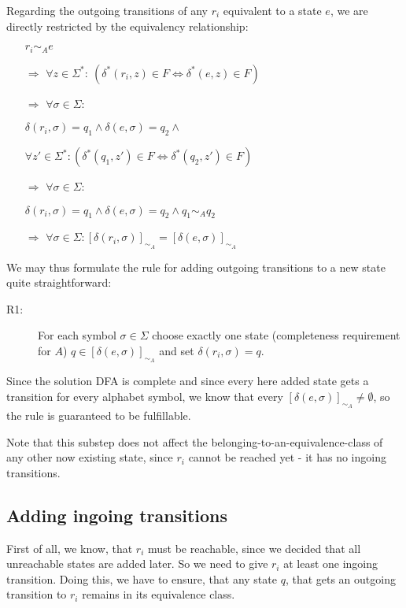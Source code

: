 Regarding the outgoing transitions of any $r_i$ equivalent to a state $e$, we are directly restricted by the equivalency relationship:
\begin{itemize}
	\item[] $r_i \sim_A e$
	\item[$\Rightarrow$] $\forall z \in \Sigma^* \colon\ (\delta^*(r_i, z) \in F \Leftrightarrow \delta^*(e, z) \in F)$
	
	\item[$\Rightarrow$] $\forall \sigma \in \Sigma \colon$
	
	\qquad $\delta(r_i, \sigma) = q_1 \land \delta(e, \sigma) = q_2 \land$
	
	\qquad $\forall z' \in \Sigma^*\colon (\delta^*(q_1, z') \in F \Leftrightarrow \delta^*(q_2, z') \in F)$
	
	\item[$\Rightarrow$] $\forall \sigma \in \Sigma \colon$
	
	\qquad $\delta(r_i, \sigma) = q_1 \land \delta(e, \sigma) = q_2 \land q_1 \sim_A q_2$
	
	\item[$\Rightarrow$] $\forall \sigma \in \Sigma \colon [\delta(r_i, \sigma)]_{\sim_A} = [\delta(e, \sigma)]_{\sim_A}$
\end{itemize}
We may thus formulate the rule for adding outgoing transitions to a new state quite straightforward:
\begin{description}
	\item[R1:] For each symbol $\sigma \in \Sigma$ choose exactly one state (completeness requirement for $A$) $q\in[\delta(e, \sigma)]_{\sim_A}$ and set $\delta(r_i, \sigma) = q$.
\end{description}
Since the solution DFA is complete and since every here added state gets a transition for every alphabet symbol, we know that every $[\delta(e, \sigma)]_{\sim_A} \neq \emptyset$, so the rule is guaranteed to be fulfillable.

Note that this substep does not affect the belonging-to-an-equivalence-class of any other now existing state, since $r_i$ cannot be reached yet - it has no ingoing transitions.

\subsection{Adding ingoing transitions}

First of all, we know, that $r_i$ must be reachable, since we decided that all unreachable states are added later. So we need to give $r_i$ at least one ingoing transition. Doing this, we have to ensure, that any state $q$, that gets an outgoing transition to $r_i$ remains in its equivalence class.

